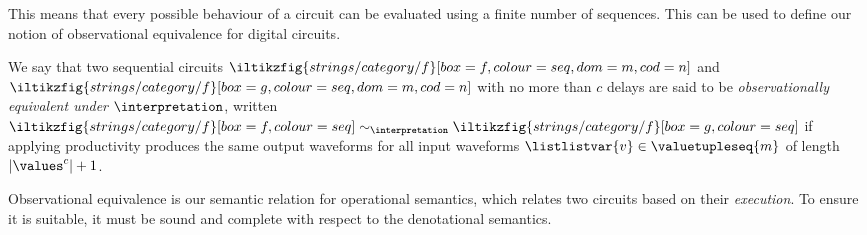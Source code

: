 \documentclass{lmcs}
\begin{document}
This means that every possible behaviour of a circuit can be evaluated using
a finite number of sequences.
This can be used to define our notion of observational equivalence for digital
circuits.

\begin{defi}
    We say that two sequential circuits \(
    \iltikzfig{strings/category/f}[box=f,colour=seq,dom=m,cod=n]
    \) and \(
    \iltikzfig{strings/category/f}[box=g,colour=seq,dom=m,cod=n]
    \) with no more than \(c\) delays are said to be
    \emph{observationally equivalent under} \(\interpretation\), written \(
    \iltikzfig{strings/category/f}[box=f,colour=seq]
    \sim_{\interpretation}
    \iltikzfig{strings/category/f}[box=g,colour=seq]
    \) if applying productivity produces the same output
    waveforms for all input waveforms \(
    \listlistvar{v} \in \valuetupleseq{m}\) of length
    \(|\values^c| + 1\).
\end{defi}

Observational equivalence is our semantic relation for operational semantics,
which relates two circuits based on their \emph{execution}.
To ensure it is suitable, it must be sound and complete with respect to the
denotational semantics.
\end{document}
